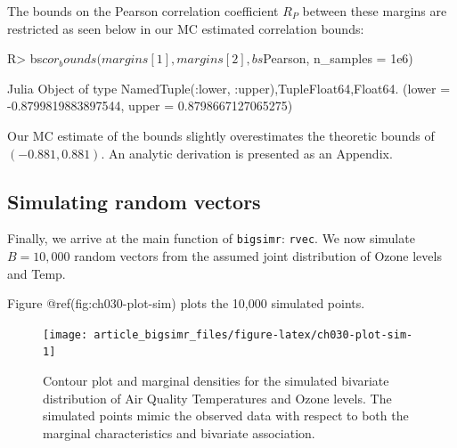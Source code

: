 \documentclass[
]{jss}
\begin{document}
The bounds on the Pearson correlation coefficient \(R_P\) between these
margins are restricted as seen below in our MC estimated correlation
bounds:

\begin{CodeChunk}
\begin{CodeInput}
R> bs$cor_bounds(margins[1], margins[2], bs$Pearson, n_samples = 1e6)
\end{CodeInput}
\begin{CodeOutput}
Julia Object of type NamedTuple{(:lower, :upper),Tuple{Float64,Float64}}.
(lower = -0.8799819883897544, upper = 0.8798667127065275)
\end{CodeOutput}
\end{CodeChunk}

Our MC estimate of the bounds slightly overestimates the theoretic
bounds of \((-0.881, 0.881)\). An analytic derivation is presented as an
Appendix.

\hypertarget{simulating-random-vectors}{%
\subsection{Simulating random vectors}\label{simulating-random-vectors}}

Finally, we arrive at the main function of \texttt{bigsimr}:
\texttt{rvec}. We now simulate \(B=10,000\) random vectors from the
assumed joint distribution of Ozone levels and Temp.

\begin{CodeChunk}
\end{CodeChunk}

Figure @ref(fig:ch030-plot-sim) plots the 10,000 simulated points.

\begin{CodeChunk}
\begin{figure}

{\centering \texttt{[image: article\_bigsimr\_files/figure-latex/ch030-plot-sim-1]} 

}

\caption[Contour plot and marginal densities for the simulated bivariate distribution of Air Quality Temperatures and Ozone levels]{Contour plot and marginal densities for the simulated bivariate distribution of Air Quality Temperatures and Ozone levels. The simulated points mimic the observed data with respect to both the marginal characteristics and bivariate association.}\label{fig:ch030-plot-sim}
\end{figure}
\end{CodeChunk}
\end{document}
